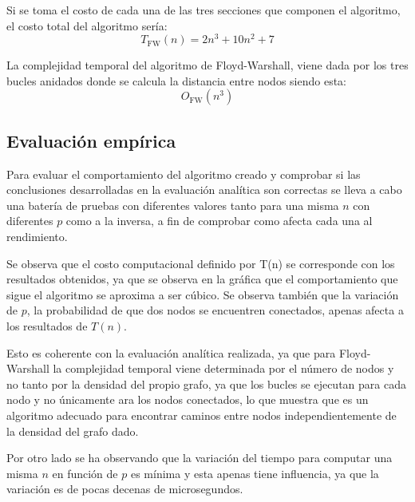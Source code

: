 Si se toma el costo de cada una de las tres secciones que componen el algoritmo, el costo total del algoritmo sería:
\begin{equation}
    T_{\mathrm{FW}}(n) = 2n^3 + 10n^2 + 7
\end{equation}

La complejidad temporal del algoritmo de Floyd-Warshall, viene dada por los tres bucles anidados donde se calcula la distancia entre nodos  siendo esta:
\begin{equation}
    O_{\mathrm{FW}}(n^3) 
\end{equation}

\subsection*{Evaluación empírica}

Para evaluar el comportamiento del algoritmo creado y comprobar si las conclusiones desarrolladas en la evaluación analítica son correctas se lleva a cabo una batería de pruebas con diferentes valores tanto para una misma $n$ con diferentes $p$ como a la inversa, a fin de comprobar como afecta cada una al rendimiento.


Se observa que el costo computacional definido por T(n) se corresponde con los resultados obtenidos, ya que se observa en la gráfica que el comportamiento que sigue el algoritmo se aproxima a ser cúbico. Se observa también que la variación de $p$, la probabilidad de que dos nodos se encuentren conectados, apenas  afecta a los resultados de $T(n)$.

Esto es coherente con la evaluación analítica realizada, ya que para Floyd-Warshall la complejidad temporal viene determinada por el número de nodos y no tanto por la densidad del propio grafo, ya que los bucles se ejecutan para cada nodo y no únicamente ara los nodos conectados, lo que muestra que es un algoritmo adecuado para encontrar caminos entre nodos independientemente de la densidad del grafo dado.

Por otro lado se ha observando que la variación del tiempo para computar una misma $n$ en función de $p$ es mínima y esta apenas tiene influencia, ya que la variación es de pocas decenas de microsegundos.
